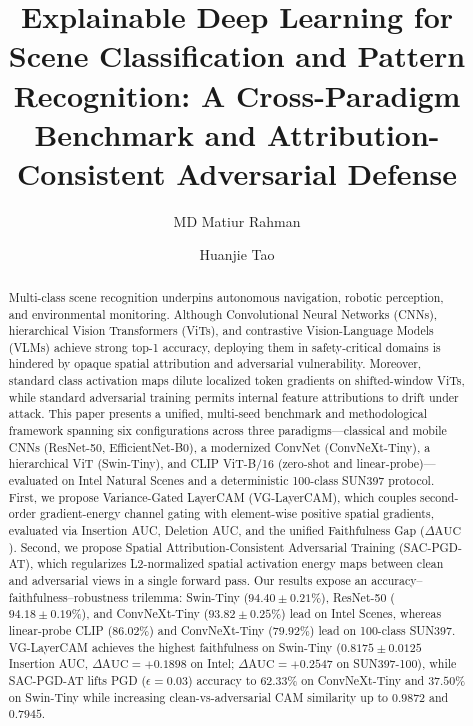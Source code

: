 \documentclass[final,5p,times,twocolumn]{elsarticle}
\begin{document}
\begin{frontmatter}

\title{Explainable Deep Learning for Scene Classification and Pattern Recognition: A Cross-Paradigm Benchmark and Attribution-Consistent Adversarial Defense}

\author[ntu]{MD Matiur Rahman}

\author[nwpu]{Huanjie Tao}


\address[ntu]{School of Artificial Intelligence and Computer Science, Nantong University, Nantong 226019, China}
\address[nwpu]{School of Computer Science, Northwestern Polytechnical University, Xi'an 710072, China}

\begin{abstract}
Multi-class scene recognition underpins autonomous navigation, robotic perception, and environmental monitoring. Although Convolutional Neural Networks (CNNs), hierarchical Vision Transformers (ViTs), and contrastive Vision-Language Models (VLMs) achieve strong top-1 accuracy, deploying them in safety-critical domains is hindered by opaque spatial attribution and adversarial vulnerability. Moreover, standard class activation maps dilute localized token gradients on shifted-window ViTs, while standard adversarial training permits internal feature attributions to drift under attack. This paper presents a unified, multi-seed benchmark and methodological framework spanning six configurations across three paradigms---classical and mobile CNNs (ResNet-50, EfficientNet-B0), a modernized ConvNet (ConvNeXt-Tiny), a hierarchical ViT (Swin-Tiny), and CLIP ViT-B/16 (zero-shot and linear-probe)---evaluated on Intel Natural Scenes and a deterministic 100-class SUN397 protocol. First, we propose Variance-Gated LayerCAM (VG-LayerCAM), which couples second-order gradient-energy channel gating with element-wise positive spatial gradients, evaluated via Insertion AUC, Deletion AUC, and the unified Faithfulness Gap ($\Delta\text{AUC}$). Second, we propose Spatial Attribution-Consistent Adversarial Training (SAC-PGD-AT), which regularizes L2-normalized spatial activation energy maps between clean and adversarial views in a single forward pass. Our results expose an accuracy--faithfulness--robustness trilemma: Swin-Tiny ($94.40 \pm 0.21\%$), ResNet-50 ($94.18 \pm 0.19\%$), and ConvNeXt-Tiny ($93.82 \pm 0.25\%$) lead on Intel Scenes, whereas linear-probe CLIP ($86.02\%$) and ConvNeXt-Tiny ($79.92\%$) lead on 100-class SUN397. VG-LayerCAM achieves the highest faithfulness on Swin-Tiny ($0.8175 \pm 0.0125$ Insertion AUC, $\Delta\text{AUC} = +0.1898$ on Intel; $\Delta\text{AUC} = +0.2547$ on SUN397-100), while SAC-PGD-AT lifts PGD ($\epsilon=0.03$) accuracy to $62.33\%$ on ConvNeXt-Tiny and $37.50\%$ on Swin-Tiny while increasing clean-vs-adversarial CAM similarity up to $0.9872$ and $0.7945$.
\end{abstract}


\end{frontmatter}
\end{document}
